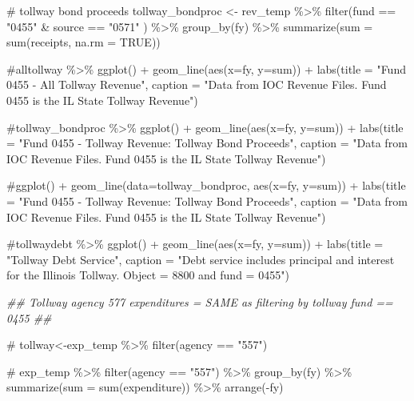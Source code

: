 \documentclass[
  letterpaper,
  DIV=11,
  numbers=noendperiod]{scrreport}
\newenvironment{Shaded}{\begin{snugshade}}{\end{snugshade}}
\newcommand{\AttributeTok}[1]{\textcolor[rgb]{0.40,0.45,0.13}{#1}}
\newcommand{\CommentTok}[1]{\textcolor[rgb]{0.37,0.37,0.37}{#1}}
\newcommand{\ConstantTok}[1]{\textcolor[rgb]{0.56,0.35,0.01}{#1}}
\newcommand{\DocumentationTok}[1]{\textcolor[rgb]{0.37,0.37,0.37}{\textit{#1}}}
\newcommand{\FunctionTok}[1]{\textcolor[rgb]{0.28,0.35,0.67}{#1}}
\newcommand{\NormalTok}[1]{\textcolor[rgb]{0.00,0.23,0.31}{#1}}
\newcommand{\OtherTok}[1]{\textcolor[rgb]{0.00,0.23,0.31}{#1}}
\newcommand{\SpecialCharTok}[1]{\textcolor[rgb]{0.37,0.37,0.37}{#1}}
\newcommand{\StringTok}[1]{\textcolor[rgb]{0.13,0.47,0.30}{#1}}
\begin{document}
\begin{Shaded}
\begin{Highlighting}[]
\CommentTok{\# tollway bond proceeds}
\NormalTok{tollway\_bondproc }\OtherTok{\textless{}{-}}\NormalTok{ rev\_temp }\SpecialCharTok{\%\textgreater{}\%} 
  \FunctionTok{filter}\NormalTok{(fund }\SpecialCharTok{==} \StringTok{"0455"} \SpecialCharTok{\&}\NormalTok{ source }\SpecialCharTok{==} \StringTok{"0571"}\NormalTok{ ) }\SpecialCharTok{\%\textgreater{}\%} 
  \FunctionTok{group\_by}\NormalTok{(fy) }\SpecialCharTok{\%\textgreater{}\%} 
  \FunctionTok{summarize}\NormalTok{(}\AttributeTok{sum =} \FunctionTok{sum}\NormalTok{(receipts, }\AttributeTok{na.rm =} \ConstantTok{TRUE}\NormalTok{))}

\CommentTok{\#alltollway \%\textgreater{}\%  ggplot() + geom\_line(aes(x=fy, y=sum)) + labs(title = "Fund 0455 {-} All Tollway Revenue", caption = "Data from IOC Revenue Files. Fund 0455 is the IL State Tollway Revenue") }

\CommentTok{\#tollway\_bondproc \%\textgreater{}\% ggplot() + geom\_line(aes(x=fy, y=sum)) + labs(title = "Fund 0455 {-} Tollway Revenue: Tollway Bond Proceeds", caption = "Data from IOC Revenue Files. Fund 0455 is the IL State Tollway Revenue")}

  

\CommentTok{\#ggplot() + geom\_line(data=tollway\_bondproc, aes(x=fy, y=sum)) + labs(title = "Fund 0455 {-} Tollway Revenue: Tollway Bond Proceeds", caption = "Data from IOC Revenue Files. Fund 0455 is the IL State Tollway Revenue")}

\CommentTok{\#tollwaydebt \%\textgreater{}\% ggplot() + geom\_line(aes(x=fy, y=sum)) + labs(title = "Tollway Debt Service", caption = "Debt service includes principal and interest for the Illinois Tollway. Object = 8800 and fund = 0455")}




\DocumentationTok{\#\# Tollway agency 577 expenditures = SAME as filtering by tollway fund == 0455 \#\#}

\CommentTok{\# tollway\textless{}{-}exp\_temp \%\textgreater{}\% filter(agency == "557")}

\CommentTok{\# exp\_temp \%\textgreater{}\% filter(agency == "557") \%\textgreater{}\% group\_by(fy) \%\textgreater{}\% summarize(sum = sum(expenditure)) \%\textgreater{}\% arrange({-}fy)}




\end{Highlighting}
\end{Shaded}
\end{document}
